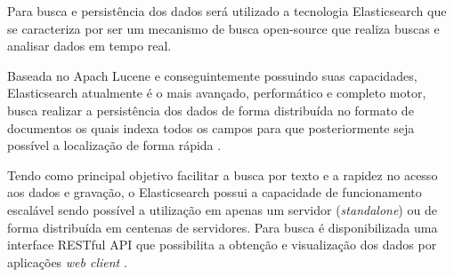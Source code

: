 Para busca e persistência dos dados será utilizado a tecnologia Elasticsearch que se caracteriza por ser um mecanismo de busca open-source que realiza buscas e analisar dados em tempo real.

Baseada no Apach Lucene e conseguintemente possuindo suas capacidades, Elasticsearch atualmente é o mais avançado, performático e completo motor, busca realizar a persistência dos dados de forma distribuída no formato de documentos os quais indexa todos os campos para que posteriormente seja possível a localização de forma rápida \cite{Gormley:2015}. 

Tendo como principal objetivo facilitar a busca por texto e a rapidez no acesso aos dados e gravação, 
o Elasticsearch possui a capacidade de funcionamento escalável sendo possível a utilização em apenas um servidor (\textit{standalone}) ou de forma distribuída em centenas de servidores.
Para busca é disponibilizada uma interface RESTful API que possibilita a obtenção e visualização dos dados por aplicações \textit{web client} \cite{Gormley:2015}.
